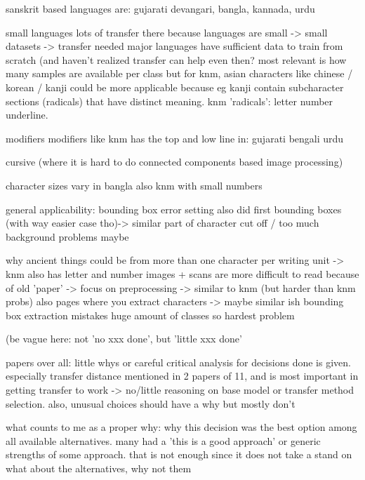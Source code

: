 \documentclass{article}
\begin{document}
sanskrit based languages are: gujarati devangari, bangla, kannada, urdu \cite{2limbachiyaGujarati}

small languages
lots of transfer there because languages are small -> small datasets -> transfer needed \cite{2limbachiyaGujarati}
major languages have sufficient data to train from scratch (and haven't realized transfer can help even then? \cite{5rasheedHandwrittenUrduWAlexNet} \cite{4zhaoTibetan}
most relevant is how many samples are available per class
but for knm, asian characters like chinese / korean / kanji could be more applicable because eg kanji contain subcharacter sections (radicals) that have distinct meaning. knm 'radicals': letter number underline. 

modifiers
modifiers like knm has the top and low line in: gujarati \cite{2limbachiyaGujarati} bengali \cite{3chatterjeeBengali} urdu \cite{5rasheedHandwrittenUrduWAlexNet}

cursive \cite{5rasheedHandwrittenUrduWAlexNet}
(where it is hard to do connected components based image processing) 

character sizes vary in bangla \cite{6shoponBangla}
also knm with small numbers

general applicability: bounding box error setting
also did first bounding boxes (with way easier case tho)-> similar part of character cut off / too much background problems maybe \cite{1akhlaghiFarsi} \cite{7rizkybasicCnnTransfer}

why ancient things could be
from \cite{9thuonPalm}
more than one character per writing unit -> knm also has letter and number
images + scans are more difficult to read because of old 'paper' -> focus on preprocessing -> similar to knm (but harder than knm probs)
also pages where you extract characters -> maybe similar ish bounding box extraction mistakes
huge amount of classes so hardest problem


(be vague here: not 'no xxx done', but 'little xxx done'

papers over all: little whys or careful critical analysis for decisions done is given. 
especially transfer distance mentioned in 2 papers of 11, and is most important in getting transfer to work -> no/little reasoning on base model or transfer method selection. also, unusual choices should have a why but mostly don't

what counts to me as a proper why: why this decision was the best option among all available alternatives. many had a 'this is a good approach' or generic strengths of some approach. that is not enough since it does not take a stand on what about the alternatives, why not them
\end{document}
